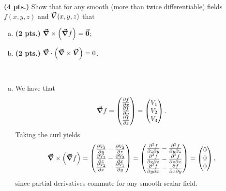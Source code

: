 \documentclass[12pt]{article} %
\begin{document}
\newpage
\begin{problem}
\textbf{(4 pts.)} Show that for any smooth (more than twice differentiable) fields $f(x,y,z)$ and $\boldsymbol{\vec{V}}(x,y,z)$ that
\begin{enumerate}[(a)]
	\item \textbf{(2 pts.)} $\boldsymbol{\vec{\nabla}} \times \left(\boldsymbol{\vec{\nabla}} f\right)=\boldsymbol{\vec{0}}$;
	\item \textbf{(2 pts.)} $\boldsymbol{\vec{\nabla}} \cdot \left(\boldsymbol{\vec{\nabla}} \times \boldsymbol{\vec{V}}\right)=0$.
\end{enumerate}
\end{problem}
\begin{solution}~
    \begin{enumerate}[(a)]
        \item We have that 
        \[
        \boldsymbol{\vec{\nabla}} f = \begin{pmatrix} \frac{\partial f}{\partial x} \\ \frac{\partial f}{\partial y} \\ \frac{\partial f}{\partial z}\end{pmatrix} = \begin{pmatrix} V_1 \\ V_2 \\ V_3 \end{pmatrix}.
        \]
        Taking the curl yields
        \[
        \boldsymbol{\vec{\nabla}} \times \left(\boldsymbol{\vec{\nabla}} f\right) = \begin{pmatrix} \frac{\partial V_3}{\partial y} - \frac{\partial V_2}{\partial z} \\ \frac{\partial V_1}{\partial z} - \frac{\partial V_3}{\partial x} \\ \frac{\partial V_2}{\partial x} - \frac{\partial V_1}{\partial y} \end{pmatrix} = 
        \begin{pmatrix} \frac{\partial^2 f}{\partial z\partial y} - \frac{\partial^2 f}{\partial y\partial z} \\ \frac{\partial^2 f}{\partial x\partial z} - \frac{\partial^2 f}{\partial z \partial x} \\ \frac{\partial^2 f}{\partial y\partial x} - \frac{\partial f}{\partial x\partial y} \end{pmatrix}= \begin{pmatrix} 0 \\ 0 \\ 0 \end{pmatrix},
        \]
        since partial derivatives commute for any smooth scalar field.
        

\end{enumerate}
\end{solution}
\end{document}
